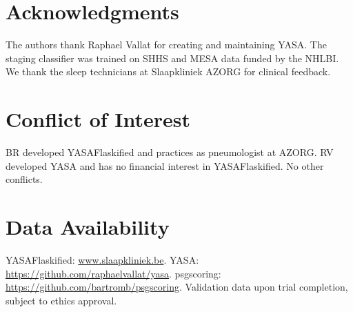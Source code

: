 \documentclass[11pt,a4paper,twocolumn]{article}
\begin{document}
\section*{Acknowledgments}

The authors thank Raphael Vallat for creating and maintaining YASA. The staging classifier was trained on SHHS and MESA data funded by the NHLBI. We thank the sleep technicians at Slaapkliniek AZORG for clinical feedback.

\section*{Conflict of Interest}

BR developed YASAFlaskified and practices as pneumologist at AZORG. RV developed YASA and has no financial interest in YASAFlaskified. No other conflicts.

\section*{Data Availability}

YASAFlaskified: \url{www.slaapkliniek.be}. YASA: \url{https://github.com/raphaelvallat/yasa}. psgscoring: \url{https://github.com/bartromb/psgscoring}. Validation data upon trial completion, subject to ethics approval.
\end{document}
